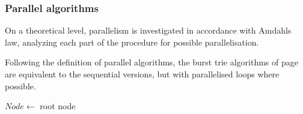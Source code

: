 \subsubsection{Parallel algorithms}
On a theoretical level, parallelism is investigated in accordance with Amdahls
law, analyzing each part of the procedure for possible parallelisation.

Following the definition of parallel algorithms, the burst trie algorithms of
page \pageref{alg:bt_insert} are equivalent to the sequential versions, but
with parallelised loops where possible.


\begin{algorithm}[H]
    \caption{$k$\FuncSty{)}}

    $Node \leftarrow$  root node\;
\end{algorithm}

